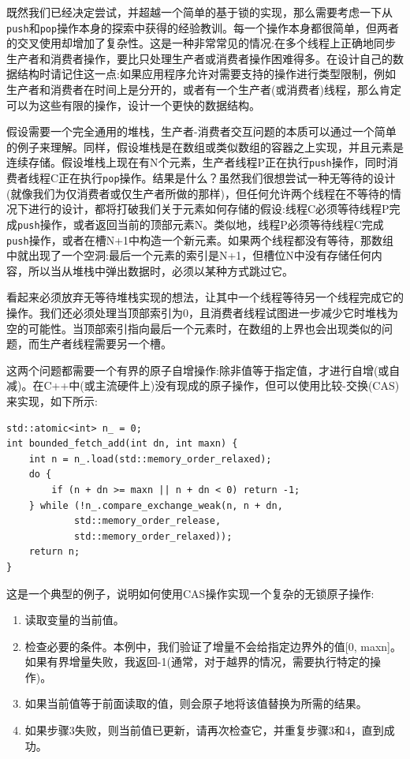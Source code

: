
既然我们已经决定尝试，并超越一个简单的基于锁的实现，那么需要考虑一下从\texttt{push}和\texttt{pop}操作本身的探索中获得的经验教训。每一个操作本身都很简单，但两者的交叉使用却增加了复杂性。这是一种非常常见的情况:在多个线程上正确地同步生产者和消费者操作，要比只处理生产者或消费者操作困难得多。在设计自己的数据结构时请记住这一点:如果应用程序允许对需要支持的操作进行类型限制，例如生产者和消费者在时间上是分开的，或者有一个生产者(或消费者)线程，那么肯定可以为这些有限的操作，设计一个更快的数据结构。

假设需要一个完全通用的堆栈，生产者-消费者交互问题的本质可以通过一个简单的例子来理解。同样，假设堆栈是在数组或类似数组的容器之上实现，并且元素是连续存储。假设堆栈上现在有N个元素，生产者线程P正在执行\texttt{push}操作，同时消费者线程C正在执行\texttt{pop}操作。结果是什么？虽然我们很想尝试一种无等待的设计(就像我们为仅消费者或仅生产者所做的那样)，但任何允许两个线程在不等待的情况下进行的设计，都将打破我们关于元素如何存储的假设:线程C必须等待线程P完成\texttt{push}操作，或者返回当前的顶部元素N。类似地，线程P必须等待线程C完成\texttt{push}操作，或者在槽N+1中构造一个新元素。如果两个线程都没有等待，那数组中就出现了一个空洞:最后一个元素的索引是N+1，但槽位N中没有存储任何内容，所以当从堆栈中弹出数据时，必须以某种方式跳过它。

看起来必须放弃无等待堆栈实现的想法，让其中一个线程等待另一个线程完成它的操作。我们还必须处理当顶部索引为0，且消费者线程试图进一步减少它时堆栈为空的可能性。当顶部索引指向最后一个元素时，在数组的上界也会出现类似的问题，而生产者线程需要另一个槽。

这两个问题都需要一个有界的原子自增操作:除非值等于指定值，才进行自增(或自减)。在C++中(或主流硬件上)没有现成的原子操作，但可以使用比较-交换(CAS)来实现，如下所示:

\begin{lstlisting}[style=styleCXX]
std::atomic<int> n_ = 0;
int bounded_fetch_add(int dn, int maxn) {
	int n = n_.load(std::memory_order_relaxed);
	do {
		if (n + dn >= maxn || n + dn < 0) return -1;
	} while (!n_.compare_exchange_weak(n, n + dn,
			std::memory_order_release,
			std::memory_order_relaxed));
	return n;
}
\end{lstlisting}

这是一个典型的例子，说明如何使用CAS操作实现一个复杂的无锁原子操作:

\begin{enumerate}
\item 读取变量的当前值。
\item 检查必要的条件。本例中，我们验证了增量不会给指定边界外的值[0, maxn]。如果有界增量失败，我返回-1(通常，对于越界的情况，需要执行特定的操作)。
\item 如果当前值等于前面读取的值，则会原子地将该值替换为所需的结果。
\item 如果步骤3失败，则当前值已更新，请再次检查它，并重复步骤3和4，直到成功。
\end{enumerate}


